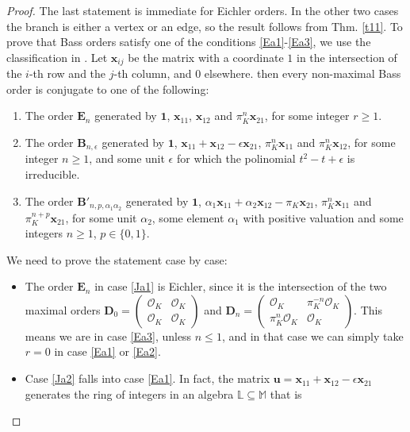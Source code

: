 \documentclass{amsart}
\theoremstyle{definition}
\newcommand\lu{\mathbb{L}}
\newcommand\alge{\mathbb{M}}
\newcommand\oink{\mathcal O}
\newcommand\Ba{\mathbf B}
\newcommand\Da{\mathbf{D}}
\newcommand\Ea{\mathbf{E}}
\newcommand\bmattrix[4]{\left(\begin{array}{cc}#1&#2\\#3&#4\end{array}\right)}
\begin{document}
\begin{proof}
    The last statement is immediate for Eichler orders.
    In the other two cases the branch is either a vertex or 
    an edge, so the result follows from Thm. \ref{t11}.
    To prove that Bass orders satisfy one of the conditions
    \ref{Ea1}-\ref{Ea3}, we use the classification in
    \cite[Prop. 5.4]{Brz83}. Let $\mathbf{x}_{ij}$ be
    the matrix with a coordinate $1$ in the intersection of 
    the $i$-th row and the $j$-th column, and $0$ elsewhere. 
    then every non-maximal 
    Bass order is conjugate to one of the following:
    \begin{enumerate}[label=($\mathfrak{J}$\bf{\arabic*})]
    \item\label{Ja1} The order $\Ea_n$ generated by
    $\mathbf{1}$, $\mathbf{x}_{11}$, $\mathbf{x}_{12}$
    and $\pi_K^n\mathbf{x}_{21}$, for some integer
    $r\geq1$.
    \item\label{Ja2} The order $\Ba_{n,\epsilon}$ generated by
    $\mathbf{1}$, $\mathbf{x}_{11}+
    \mathbf{x}_{12}-\epsilon\mathbf{x}_{21}$, 
    $\pi_K^n\mathbf{x}_{11}$
    and $\pi_K^n\mathbf{x}_{12}$, for some integer
    $n\geq1$, and some unit $\epsilon$ for which
    the polinomial $t^2-t+\epsilon$ 
    is irreducible.
    \item \label{Ja3} The order 
    $\Ba'_{n,p,\alpha_1\alpha_2}$ generated by
    $\mathbf{1}$, $\alpha_1\mathbf{x}_{11}+
    \alpha_2\mathbf{x}_{12}-
    \pi_K\mathbf{x}_{21}$, 
    $\pi_K^n\mathbf{x}_{11}$
    and $\pi_K^{n+p}\mathbf{x}_{21}$, 
    for some unit 
    $\alpha_2$, some element $\alpha_1$
    with positive valuation and some 
    integers $n\geq1$,
    $p\in\{0,1\}$.
\end{enumerate} 
    We need to prove the statement case 
    by case:
    \begin{itemize}
    \item The order
    $\Ea_n$ in case \ref{Ja1} is Eichler, since
    it is the intersection of the two 
    maximal orders $\Da_0=
    \bmattrix{\oink_K}{\oink_K}{\oink_K}{\oink_K}$
    and $\Da_n=
    \bmattrix{\oink_K}{\pi_K^{-n}\oink_K}
    {\pi_K^n\oink_K}{\oink_K}$. This 
    means we are in
    case \ref{Ea3}, unless $n\leq1$, 
    and in that case
    we can simply take $r=0$ in case 
    \ref{Ea1} or \ref{Ea2}.
    \item
    Case \ref{Ja2} falls into case \ref{Ea1}.
    In fact, the matrix $\mathbf{u}=
    \mathbf{x}_{11}+\mathbf{x}_{12}-
    \epsilon\mathbf{x}_{21}$ generates 
    the ring of integers
    in an algebra $\lu\subseteq\alge$ that is 

\end{itemize}
\end{proof}
\end{document}
